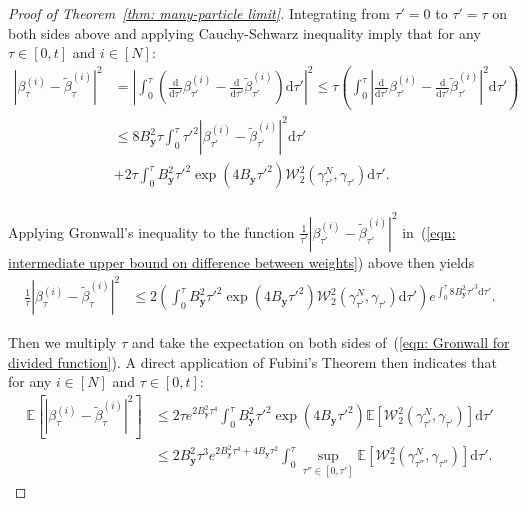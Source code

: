 \documentclass{article}
\numberwithin{equation}{section}
\def\eqref#1{(\ref{#1})}
\newcommand{\dif}{{\mathrm{d}}}
\def\vy{{\bm{y}}}
\def\gW{{\mathcal{W}}}
\newcommand{\E}{\mathbb{E}}
\begin{document}
\begin{proof}[Proof of Theorem~\ref{thm: many-particle limit}]
    Integrating from $\tau'=0$ to $\tau'=\tau$ on both sides above and applying Cauchy-Schwarz inequality imply that for any $\tau \in [0,t]$ and $i \in [N]$:
    \begin{equation}
    \label{eqn: intermediate upper bound on difference between weights}
    \begin{aligned}
    \left|\beta^{(i)}_{\tau} - \widetilde{\beta}^{(i)}_{\tau}\right|^2 &= \left|\int_{0}^{\tau}\left(\frac{\dif}{\dif \tau'}\beta^{(i)}_{\tau'} - \frac{\dif}{\dif \tau'}\widetilde{\beta}^{(i)}_{\tau'}\right)\dif\tau'\right|^2 \leq \tau\left(\int_{0}^{\tau}\left|\frac{\dif}{\dif \tau'}\beta^{(i)}_{\tau'} - \frac{\dif}{\dif \tau'}\widetilde{\beta}^{(i)}_{\tau'}\right|^2\dif\tau'\right)\\
    &\leq 8B_{\vy}^2\tau\int_{0}^{\tau}\tau'^2\left|\beta^{(i)}_{\tau'} - \widetilde{\beta}^{(i)}_{\tau'}\right|^2\dif\tau' \\
    &+ 2\tau\int_{0}^{\tau}B_{\vy}^2\tau'^2\exp\left(4B_{\vy}\tau'^2\right)\gW^2_2\left(\gamma^N_{\tau'},\gamma_{\tau'}\right)\dif\tau'.\\
    \end{aligned}    
    \end{equation}

    Applying Gronwall's inequality to the function $\frac{1}{\tau'}\left|\beta^{(i)}_{\tau'} - \widetilde{\beta}^{(i)}_{\tau'}\right|^2$ in~\eqref{eqn: intermediate upper bound on difference between weights} above then yields 
    \begin{equation}
    \label{eqn: Gronwall for divided function}
    \begin{aligned}
    \frac{1}{\tau}\left|\beta^{(i)}_{\tau} - \widetilde{\beta}^{(i)}_{\tau}\right|^2 &\leq 2\left(\int_{0}^{\tau}B_{\vy}^2\tau'^2\exp\left(4B_{\vy}\tau'^2\right)\gW^2_2\left(\gamma^N_{\tau'},\gamma_{\tau'}\right)\dif\tau'\right)e^{\int_{0}^{\tau}8B_{\vy}^2\tau'^3\dif\tau'}.
    \end{aligned}    
    \end{equation}

    Then we multiply $\tau$ and take the expectation on both sides of~\eqref{eqn: Gronwall for divided function}. A direct application of Fubini's Theorem then indicates that for any $i \in [N]$ and $\tau \in [0,t]$:
    \begin{equation}
    \label{eqn: bound on expectation via integral}
    \begin{aligned}
    \E\left[\left|\beta^{(i)}_{\tau} - \widetilde{\beta}^{(i)}_{\tau}\right|^2\right] 
    &\leq 2\tau e^{2B_{\vy}^2\tau^4}\int_{0}^{\tau}B_{\vy}^2\tau'^2\exp\left(4B_{\vy}\tau'^2\right)\E\left[\gW^2_2\left(\gamma^N_{\tau'},\gamma_{\tau'}\right)\right]\dif\tau'\\
    &\leq 2B_{\vy}^2\tau^3e^{2B_{\vy}^2\tau^4 + 4B_{\vy}\tau^2}\int_{0}^{\tau}\sup_{\tau''\in[0,\tau']}\E\left[\gW^2_2\left(\gamma^N_{\tau''},\gamma_{\tau''}\right)\right]\dif\tau'.
    \end{aligned}    
    \end{equation}


\end{proof}
\end{document}
